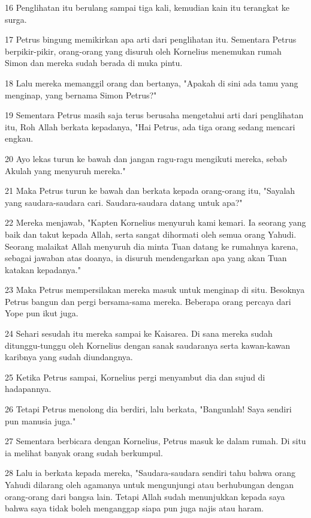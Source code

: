 \par 16 Penglihatan itu berulang sampai tiga kali, kemudian kain itu terangkat ke surga.
\par 17 Petrus bingung memikirkan apa arti dari penglihatan itu. Sementara Petrus berpikir-pikir, orang-orang yang disuruh oleh Kornelius menemukan rumah Simon dan mereka sudah berada di muka pintu.
\par 18 Lalu mereka memanggil orang dan bertanya, "Apakah di sini ada tamu yang menginap, yang bernama Simon Petrus?"
\par 19 Sementara Petrus masih saja terus berusaha mengetahui arti dari penglihatan itu, Roh Allah berkata kepadanya, "Hai Petrus, ada tiga orang sedang mencari engkau.
\par 20 Ayo lekas turun ke bawah dan jangan ragu-ragu mengikuti mereka, sebab Akulah yang menyuruh mereka."
\par 21 Maka Petrus turun ke bawah dan berkata kepada orang-orang itu, "Sayalah yang saudara-saudara cari. Saudara-saudara datang untuk apa?"
\par 22 Mereka menjawab, "Kapten Kornelius menyuruh kami kemari. Ia seorang yang baik dan takut kepada Allah, serta sangat dihormati oleh semua orang Yahudi. Seorang malaikat Allah menyuruh dia minta Tuan datang ke rumahnya karena, sebagai jawaban atas doanya, ia disuruh mendengarkan apa yang akan Tuan katakan kepadanya."
\par 23 Maka Petrus mempersilakan mereka masuk untuk menginap di situ. Besoknya Petrus bangun dan pergi bersama-sama mereka. Beberapa orang percaya dari Yope pun ikut juga.
\par 24 Sehari sesudah itu mereka sampai ke Kaisarea. Di sana mereka sudah ditunggu-tunggu oleh Kornelius dengan sanak saudaranya serta kawan-kawan karibnya yang sudah diundangnya.
\par 25 Ketika Petrus sampai, Kornelius pergi menyambut dia dan sujud di hadapannya.
\par 26 Tetapi Petrus menolong dia berdiri, lalu berkata, "Bangunlah! Saya sendiri pun manusia juga."
\par 27 Sementara berbicara dengan Kornelius, Petrus masuk ke dalam rumah. Di situ ia melihat banyak orang sudah berkumpul.
\par 28 Lalu ia berkata kepada mereka, "Saudara-saudara sendiri tahu bahwa orang Yahudi dilarang oleh agamanya untuk mengunjungi atau berhubungan dengan orang-orang dari bangsa lain. Tetapi Allah sudah menunjukkan kepada saya bahwa saya tidak boleh menganggap siapa pun juga najis atau haram.
